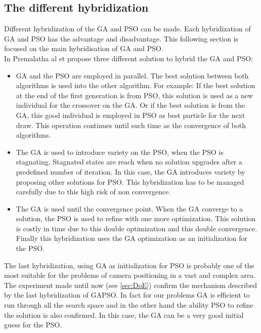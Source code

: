 \subsection{The different hybridization }

 Different hybridization of the GA and PSO can be made. Each hybridization of GA and PSO has the advantage and disadvantage. This following section is focused on the main hybridisation of GA and PSO. \\
In Premalatha al et \cite{76*premalatha2009}  propose three different solution to hybrid the GA and PSO: 
\begin{itemize}
\item  GA and the PSO are employed in parallel. The best solution between both algorithms is used into the other algorithm. 
For example: If the best solution at the end of the first generation is from PSO, this solution is used as a new individual for the crossover on the GA. Or if the best solution is from the GA, this good individual is employed in PSO as best particle for the next draw. This operation continues until such time as the convergence of both algorithms.   
 
\item The GA is used to introduce variety on the PSO, when the PSO is stagnating. Stagnated states are reach when no solution upgrades after a predefined number of iteration. In this case, the GA introduces variety by proposing other solutions for PSO. This hybridization has to be managed carefully due to this high risk of non convergence. 

\item The GA is used until the convergence point. When the GA converge to a solution, the PSO is used to refine with one more optimization. This solution is costly in time due to this double optimization and this double convergence. Finally this hybridization uses the GA optimization as an initialization for the PSO.\\
\end{itemize}

The last hybridization, using GA as initialization for PSO is probably one of the most suitable for the problems of camera positioning in a vast and complex area. 
The experiment made until now (see \ref{sec:DoE}) confirm the mechanism described by the last hybridization of GAPSO. In fact for our problems GA is efficient to run through all the search space and in the other hand the  ability PSO to refine the solution is also confirmed.  
In this case, the GA can be a very good initial guess for the PSO. \\

